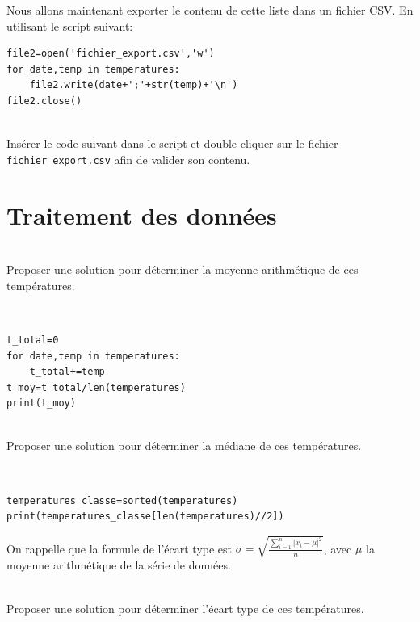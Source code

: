 Nous allons maintenant exporter le contenu de cette liste dans un fichier CSV. En utilisant le script suivant:

\begin{verbatim}
file2=open('fichier_export.csv','w')
for date,temp in temperatures:
    file2.write(date+';'+str(temp)+'\n')
file2.close()
\end{verbatim}

\begin{exercice}~\\
Insérer le code suivant dans le script et double-cliquer sur le fichier \verb?fichier_export.csv? afin de valider son contenu.
\end{exercice}

\section{Traitement des données}

\begin{exercice}~\\
Proposer une solution pour déterminer la moyenne arithmétique de ces températures.
\end{exercice}

\begin{solution}~\ \\
\begin{verbatim}
t_total=0
for date,temp in temperatures:
    t_total+=temp
t_moy=t_total/len(temperatures)
print(t_moy)
\end{verbatim}
\end{solution}

\begin{exercice}~\\
Proposer une solution pour déterminer la médiane de ces températures.
\end{exercice}

\begin{solution}~\ \\
\begin{verbatim}
temperatures_classe=sorted(temperatures)
print(temperatures_classe[len(temperatures)//2])
\end{verbatim}
\end{solution}

On rappelle que la formule de l'écart type est $\sigma=\sqrt{\frac{\sum\limits_{i=1}^{n} |x_i-\mu|^2}{n}}$, avec $\mu$ la moyenne arithmétique de la série de données.

\begin{exercice}~\\
Proposer une solution pour déterminer l'écart type de ces températures.
\end{exercice}

